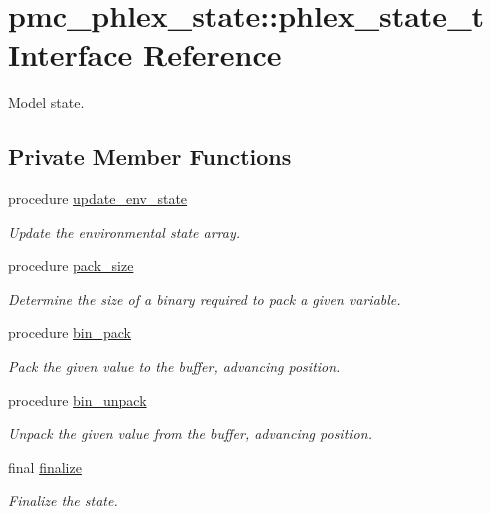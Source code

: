 \hypertarget{structpmc__phlex__state_1_1phlex__state__t}{}\section{pmc\+\_\+phlex\+\_\+state\+:\+:phlex\+\_\+state\+\_\+t Interface Reference}
\label{structpmc__phlex__state_1_1phlex__state__t}


Model state.  


\subsection*{Private Member Functions}
\begin{DoxyCompactItemize}
\item 
procedure \mbox{\hyperlink{structpmc__phlex__state_1_1phlex__state__t_abb56d00f128933e322c042df3d905b13}{update\+\_\+env\+\_\+state}}
\begin{DoxyCompactList}\small\item\em Update the environmental state array. \end{DoxyCompactList}\item 
procedure \mbox{\hyperlink{structpmc__phlex__state_1_1phlex__state__t_aaba168932a6db9f433acb50557bcbdd2}{pack\+\_\+size}}
\begin{DoxyCompactList}\small\item\em Determine the size of a binary required to pack a given variable. \end{DoxyCompactList}\item 
procedure \mbox{\hyperlink{structpmc__phlex__state_1_1phlex__state__t_a8a0a149f1d1a4dd8309482a9161fcb7e}{bin\+\_\+pack}}
\begin{DoxyCompactList}\small\item\em Pack the given value to the buffer, advancing position. \end{DoxyCompactList}\item 
procedure \mbox{\hyperlink{structpmc__phlex__state_1_1phlex__state__t_a5b3dc4f7b31785224dfdc2f4c9d283c7}{bin\+\_\+unpack}}
\begin{DoxyCompactList}\small\item\em Unpack the given value from the buffer, advancing position. \end{DoxyCompactList}\item 
final \mbox{\hyperlink{structpmc__phlex__state_1_1phlex__state__t_a8451953c6b059d800d8298f36e43f6cb}{finalize}}
\begin{DoxyCompactList}\small\item\em Finalize the state. \end{DoxyCompactList}\end{DoxyCompactItemize}
